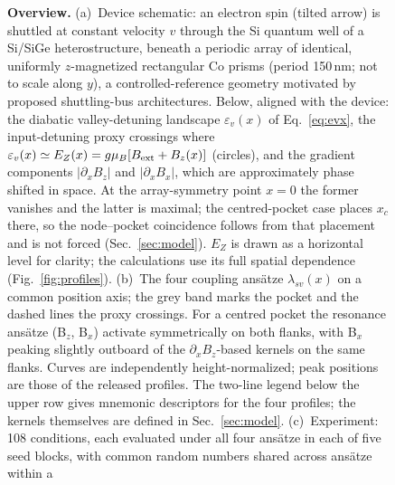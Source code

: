 \documentclass[aip,jap,reprint,superscriptaddress,longbibliography,floatfix]{revtex4-2}
\begin{document}
\begin{figure}[p]
{}%
\caption{\textbf{Overview.}
(a)~Device schematic: an electron spin (tilted arrow) is shuttled at constant
velocity $v$ through the Si quantum well of a Si/SiGe heterostructure, beneath a
periodic array of identical, uniformly $z$-magnetized rectangular Co prisms
(period 150\,nm; not to scale along $y$), a controlled-reference geometry
motivated by proposed shuttling-bus architectures. Below, aligned with the
device: the diabatic valley-detuning landscape $\varepsilon_v(x)$ of
Eq.~\eqref{eq:evx}, the input-detuning proxy crossings where
$\varepsilon_v(x)\simeq E_Z(x)=g\mu_B[B_{\rm ext}+B_z(x)]$ (circles), and the
gradient components $|\partial_x B_z|$ and $|\partial_x B_x|$, which are
approximately phase shifted in space. At the array-symmetry point $x=0$ the
former vanishes and the latter is maximal; the centred-pocket case places $x_c$
there, so the node--pocket coincidence follows from that placement and is not
forced (Sec.~\ref{sec:model}). $E_Z$ is drawn as a horizontal level for clarity;
the calculations use its full spatial dependence (Fig.~\ref{fig:profiles}).
(b)~The four coupling ans\"atze $\lambda_{sv}(x)$ on a common position axis; the
grey band marks the pocket and the dashed lines the proxy crossings. For a
centred pocket the resonance ans\"atze (B$_z$, B$_x$) activate symmetrically on
both flanks, with B$_x$ peaking slightly outboard of the $\partial_x B_z$-based
kernels on the same flanks. Curves are independently height-normalized; peak
positions are those of the released profiles. The two-line legend below the
upper row gives mnemonic descriptors for the four profiles; the kernels
themselves are defined in Sec.~\ref{sec:model}.
(c)~Experiment: 108 conditions, each evaluated under all four ans\"atze in each
of five seed blocks, with common random numbers shared across ans\"atze within a
}
\end{figure}
\end{document}
